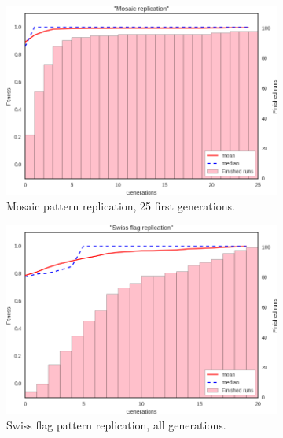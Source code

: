 \begin{figure}[t]
\centering
\begin{subfigure}[t]{.45\columnwidth}
\centering
\includegraphics[width=\columnwidth]{fig/replicate_mosaic_results}
\caption{Mosaic pattern replication, 25 first generations.}
\label{fig:replicate_mosaic_results}
\end{subfigure}
\begin{subfigure}[t]{.45\columnwidth}
\centering
\includegraphics[width=\columnwidth]{fig/replicate_swiss_results}
\caption{Swiss flag pattern replication, all generations.}
\label{fig:replicate_swiss_results}
\end{subfigure}
\begin{subfigure}[t]{.45\columnwidth}
\centering

\end{subfigure}
\end{figure}

